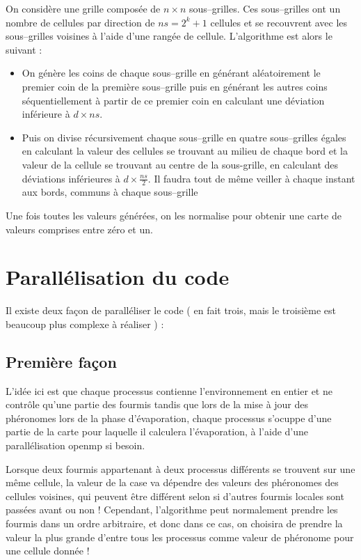 \documentclass[a4]{article}
\begin{document}
On considère une grille composée de $n\times n$ sous--grilles. Ces sous--grilles ont un nombre de cellules par direction de
$ns=2^{k}+1$ cellules et se recouvrent avec les sous--grilles voisines à l'aide d'une rangée de cellule.
L'algorithme est alors le suivant :
\begin{itemize}
\item On génère les coins de chaque sous--grille en générant aléatoirement le premier coin de la première sous--grille puis en générant les autres coins séquentiellement à partir de ce premier coin en calculant une déviation inférieure à $d\times ns$.
\item Puis on divise récursivement chaque sous--grille en quatre sous--grilles égales en calculant la valeur des cellules se trouvant au milieu
de chaque bord et la valeur de la cellule se trouvant au centre de la sous-grille, en calculant des déviations inférieures à
$d\times \frac{ns}{2}$. Il faudra tout de même veiller à chaque instant aux bords, communs à chaque sous--grille
\end{itemize}

Une fois toutes les valeurs générées, on les normalise pour obtenir une carte de valeurs comprises entre zéro et un.

\section{Parallélisation du code}

Il existe deux façon de paralléliser le code ( en fait trois, mais le troisième est beaucoup plus complexe à réaliser ) :
\subsection{Première façon}
L'idée ici est que chaque processus contienne l'environnement en entier et ne contrôle qu'une partie des fourmis tandis que lors de la mise
à jour des phéronomes lors de la phase d'évaporation, chaque processus s'ocuppe d'une partie de la carte pour laquelle il calculera l'évaporation, à l'aide d'une parallélisation openmp si besoin.

Lorsque deux fourmis appartenant à deux processus différents se trouvent sur une même cellule, la valeur de la case va dépendre des valeurs des phéronomes des cellules voisines, qui peuvent être différent selon si d'autres fourmis locales sont passées avant ou non ! Cependant, l'algorithme peut normalement prendre les fourmis dans un ordre arbitraire, et donc dans ce cas, on choisira de prendre la valeur la plus grande d'entre tous les processus comme valeur de phéronome pour une cellule donnée !
\end{document}
